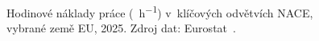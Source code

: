 \def\strEuOdvetvoveMzdyBarTitle{Hodinové náklady práce dle odvětví (2025)}%
\def\strEuOdvetvoveMzdyBarYlabel{hodinové náklady práce [\si{\pps\per\hour}]}%
\def\strEuOdvetvoveMzdyBarCaption{Hodinové náklady práce (\si{\pps\per\hour}) v~klíčových odvětvích \acs{NACE}, vybrané země \acs{EU}, 2025. Zdroj dat: Eurostat~\cite{eurostat_lc_lci_lev_D1D4MD5_PPS_h}.}%
%
\begin{figure}[H]
  \centering
  
  \caption{\strEuOdvetvoveMzdyBarCaption}
  \label{fig:eu_odvetvove_mzdy_bar}
\end{figure}

